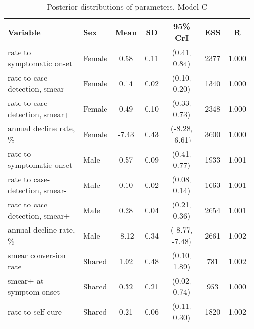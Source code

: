 \begin{table}[h]

\caption{\label{tab:}Posterior distributions of parameters, Model C}
\centering
\begin{tabular}[t]{llccccc}
\toprule
Variable & Sex & Mean & SD & 95\% CrI & ESS & \^{R}\\
\midrule
rate to symptomatic onset & Female & 0.58 & 0.11 & (0.41, 0.84) & 2377 & 1.000\\
rate to case-detection, smear- & Female & 0.14 & 0.02 & (0.10, 0.20) & 1340 & 1.000\\
rate to case-detection, smear+ & Female & 0.49 & 0.10 & (0.33, 0.73) & 2348 & 1.000\\
annual decline rate, \% & Female & -7.43 & 0.43 & (-8.28, -6.61) & 3600 & 1.000\\
\addlinespace
rate to symptomatic onset & Male & 0.57 & 0.09 & (0.41, 0.77) & 1933 & 1.001\\
rate to case-detection, smear- & Male & 0.10 & 0.02 & (0.08, 0.14) & 1663 & 1.001\\
rate to case-detection, smear+ & Male & 0.28 & 0.04 & (0.21, 0.36) & 2654 & 1.001\\
annual decline rate, \% & Male & -8.12 & 0.34 & (-8.77, -7.48) & 2661 & 1.002\\
\addlinespace
smear conversion rate & Shared & 1.02 & 0.48 & (0.10, 1.89) & 781 & 1.002\\
smear+ at symptom onset & Shared & 0.32 & 0.21 & (0.02, 0.74) & 953 & 1.000\\
rate to self-cure & Shared & 0.21 & 0.06 & (0.11, 0.30) & 1820 & 1.002\\
\bottomrule
\end{tabular}
\end{table}
